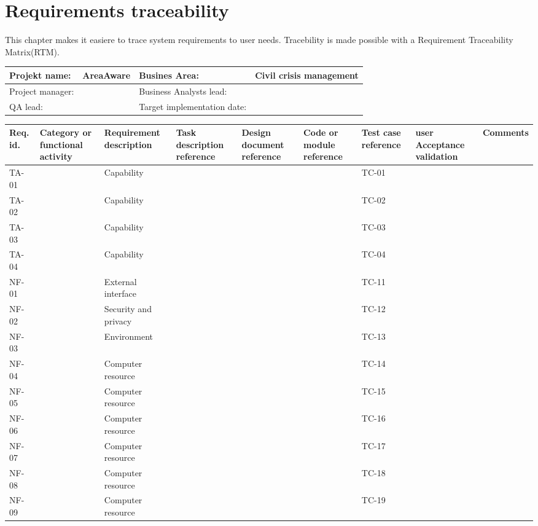 \label{chp_requirementsTraceability}
\chapter{Requirements traceability}
This chapter makes it easiere to trace system requirements to user needs. Tracebility is made possible with a Requirement Traceability Matrix(RTM).

\begin{sidewaystable}
	\begin{longtable}{| p{3.5cm}  | p{5cm} |  p{3.5cm}  | p{7.8cm} |  }
		\hline
		Projekt name: 	& AreaAware & Busines Area:	& Civil crisis management \\ \hline
		Project manager:& & Business Analysts lead: 	& \\ \hline
		QA lead: 		& & Target implementation date:	& \\ \hline
	\end{longtable}
	\vspace{-9pt}
	\begin{longtable}{| p{1.1cm}  | p{2cm}  | p{5cm} |  p{1.5cm}  | p{1.5cm}  |  p{1.5cm}  | p{1.5cm}  |  p{1.5cm}  | p{2cm}  |  } \hline
		Req. id. 	& Category or functional activity & Requirement description & Task description reference & Design document reference & Code or module reference & Test case reference & user Acceptance validation & Comments \\ \hline
		TA-01&& Capability&&&& TC-01 && \\ \hline
		TA-02&& Capability&&&& TC-02 && \\ \hline
		TA-03&& Capability&&&& TC-03 && \\ \hline
		TA-04&& Capability&&&& TC-04 && \\ \hline
		NF-01&& External interface&&&& TC-11 && \\ \hline
		NF-02&& Security and privacy&&&& TC-12 && \\ \hline
		NF-03&& Environment&&&& TC-13 && \\ \hline
		NF-04&& Computer resource&&&& TC-14 && \\ \hline
		NF-05&& Computer resource&&&& TC-15 && \\ \hline
		NF-06&& Computer resource&&&& TC-16 && \\ \hline
		NF-07&& Computer resource&&&& TC-17 && \\ \hline
		NF-08&& Computer resource&&&& TC-18 && \\ \hline
		NF-09&& Computer resource&&&& TC-19 && \\ \hline

\end{longtable}
\end{sidewaystable}
